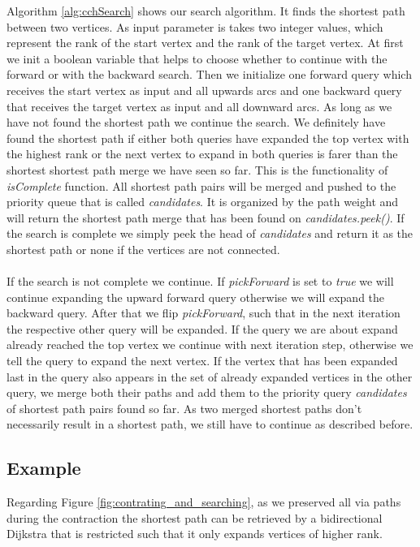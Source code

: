Algorithm \ref{alg:cchSearch} shows our search algorithm.
It finds the shortest path between two vertices.
As input parameter is takes two integer values, which represent the rank of the start vertex and the rank of the target vertex.
At first we init a boolean variable that helps to choose whether to continue with the forward or with the backward search.
Then we initialize one forward query which receives the start vertex as input and all upwards arcs and one backward query that receives the target vertex as input and all downward arcs.
As long as we have not found the shortest path we continue the search.
We definitely have found the shortest path if either both queries have expanded the top vertex with the highest rank or the next vertex to expand in both queries is farer than the shortest shortest path merge we have seen so far.
This is the functionality of \textit{isComplete} function.
All shortest path pairs will be merged and pushed to the priority queue that is called \textit{candidates}.
It is organized by the path weight and will return the shortest path merge that has been found on \textit{candidates.peek()}.
If the search is complete we simply peek the head of \textit{candidates} and return it as the shortest path or none if the vertices are not connected.
\\\\
If the search is not complete we continue.
If \textit{pickForward} is set to \textit{true} we will continue expanding the upward forward query otherwise we will expand the backward query.
After that we flip \textit{pickForward}, such that in the next iteration the respective other query will be expanded.
If the query we are about expand already reached the top vertex we continue with next iteration step, otherwise we tell the query to expand the next vertex.
If the vertex that has been expanded last in the query also appears in the set of already expanded vertices in the other query, we merge both their paths and add them to the priority query \textit{candidates} of shortest path pairs found so far.
As two merged shortest paths don't necessarily result in a shortest path, we still have to continue as described before.

\subsection{Example}

Regarding Figure \ref{fig:contrating_and_searching}, as we preserved all via paths during the contraction the shortest path can be retrieved by a bidirectional Dijkstra that is restricted such that it only expands vertices of higher rank.


